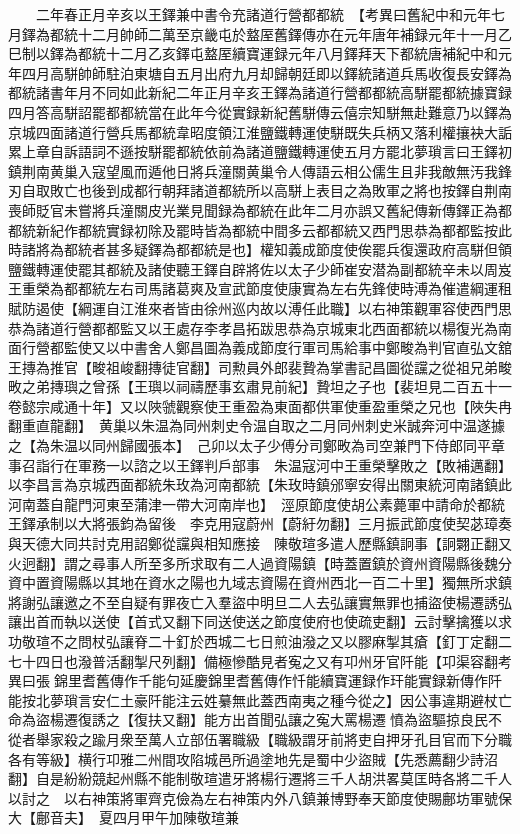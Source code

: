 　　二年春正月辛亥以王鐸兼中書令充諸道行營都都統　【考異曰舊紀中和元年七月鐸為都統十二月帥師二萬至京畿屯於盩厔舊鐸傳亦在元年唐年補録元年十一月乙巳制以鐸為都統十二月乙亥鐸屯盩厔續寶運録元年八月鐸拜天下都統唐補紀中和元年四月高駢帥師駐泊東塘自五月出府九月却歸朝廷即以鐸統諸道兵馬收復長安鐸為都統諸書年月不同如此新紀二年正月辛亥王鐸為諸道行營都都統高駢罷都統據寶録四月答高駢詔罷都都統當在此年今從實録新紀舊駢傳云僖宗知駢無赴難意乃以鐸為京城四面諸道行營兵馬都統韋昭度領江淮鹽鐵轉運使駢既失兵柄又落利權攘袂大詬累上章自訴語詞不遜按駢罷都統依前為諸道鹽鐵轉運使五月方罷北夢瑣言曰王鐸初鎮荆南黄巢入寇望風而遁他日將兵潼關黄巢令人傳語云相公儒生且非我敵無汚我鋒刃自取敗亡也後到成都行朝拜諸道都統所以高駢上表目之為敗軍之將也按鐸自荆南喪師貶官未嘗將兵潼關皮光業見聞録為都統在此年二月亦誤又舊紀傳新傳鐸正為都都統新紀作都統實録初除及罷時皆為都統中間多云都都統又西門思恭為都都監按此時諸將為都統者甚多疑鐸為都都統是也】權知義成節度使俟罷兵復還政府高駢但領鹽鐵轉運使罷其都統及諸使聽王鐸自辟將佐以太子少師崔安潜為副都統辛未以周岌王重榮為都都統左右司馬諸葛爽及宣武節度使康實為左右先鋒使時溥為催遣綱運租賦防遏使【綱運自江淮來者皆由徐州巡内故以溥任此職】以右神策觀軍容使西門思恭為諸道行營都都監又以王處存李孝昌拓跋思恭為京城東北西面都統以楊復光為南面行營都監使又以中書舍人鄭昌圖為義成節度行軍司馬給事中鄭畯為判官直弘文舘王摶為推官【畯祖峻翻摶徒官翻】司勲員外郎裴贄為掌書記昌圖從讜之從祖兄弟畯畋之弟摶璵之曾孫【王璵以祠禱歷事玄肅見前紀】贄坦之子也【裴坦見二百五十一卷懿宗咸通十年】又以陜虢觀察使王重盈為東面都供軍使重盈重榮之兄也【陜失冉翻重直龍翻】　黄巢以朱温為同州刺史令温自取之二月同州刺史米誠奔河中温遂據之【為朱温以同州歸國張本】　己卯以太子少傅分司鄭畋為司空兼門下侍郎同平章事召詣行在軍務一以諮之以王鐸判戶部事　朱温寇河中王重榮擊敗之【敗補邁翻】以李昌言為京城西面都統朱玫為河南都統【朱玫時鎮邠寧安得出關東統河南諸鎮此河南蓋自龍門河東至蒲津一帶大河南岸也】　涇原節度使胡公素薨軍中請命於都統王鐸承制以大將張鈞為留後　李克用寇蔚州【蔚紆勿翻】三月振武節度使契苾璋奏與天德大同共討克用詔鄭從讜與相知應接　陳敬瑄多遣人歷縣鎮詗事【詗翾正翻又火迥翻】謂之尋事人所至多所求取有二人過資陽鎮【時蓋置鎮於資州資陽縣後魏分資中置資陽縣以其地在資水之陽也九域志資陽在資州西北一百二十里】獨無所求鎮將謝弘讓邀之不至自疑有罪夜亡入羣盜中明旦二人去弘讓實無罪也捕盜使楊遷誘弘讓出首而執以送使【首式又翻下同送使送之節度使府也使疏吏翻】云討擊擒獲以求功敬瑄不之問杖弘讓脊二十釘於西城二七日煎油潑之又以膠麻掣其瘡【釘丁定翻二七十四日也潑普活翻掣尺列翻】備極慘酷見者寃之又有卭州牙官阡能【卭渠容翻考異曰張錦里耆舊傳作千能句延慶錦里耆舊傳作忏能續寶運録作玕能實録新傳作阡能按北夢瑣言安仁土豪阡能注云姓繤無此蓋西南夷之種今從之】因公事違期避杖亡命為盜楊遷復誘之【復扶又翻】能方出首聞弘讓之寃大罵楊遷憤為盜驅掠良民不從者舉家殺之踰月衆至萬人立部伍署職級【職級謂牙前將吏自押牙孔目官而下分職各有等級】横行卭雅二州間攻陷城邑所過塗地先是蜀中少盜賊【先悉薦翻少詩沼翻】自是紛紛競起州縣不能制敬瑄遣牙將楊行遷將三千人胡洪畧莫匡時各將二千人以討之　以右神策將軍齊克儉為左右神策内外八鎮兼博野奉天節度使賜鄜坊軍號保大【鄜音夫】　夏四月甲午加陳敬瑄兼

